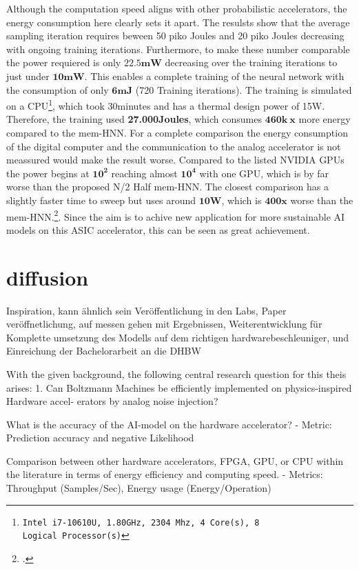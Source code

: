 Although the computation speed aligns with other probabilistic accelerators, the energy consumption here clearly sets it apart.
The resulsts show that the average sampling iteration requires beween 50 piko Joules and 20 piko Joules decreasing with ongoing training iterations.
Furthermore, to make these number comparable the power requiered is only \(\mathbf{22.5mW}\) decreasing over the training iterations to just under \(\mathbf{10mW}\).
This enables a complete training of the neural network with the consumption of only \(\mathbf{6 mJ}\) (720 Training iterations).
The training is simulated on a CPU\footnote{\texttt{Intel i7-10610U, 1.80GHz, 2304 Mhz, 4 Core(s), 8 Logical Processor(s)}}, which took 30minutes and has a thermal design power of 15W.
Therefore, the training used \textbf{27.000Joules}, which consumes \(\mathbf{460k \ x}\) more energy compared to the \ac{mem-HNN}.
For a complete comparison the energy consumption of the digital computer and the communication to the analog accelerator is not meassured 
would make the result worse. 
Compared to the listed NVIDIA \ac{GPU}s the power begins at \(\mathbf{10^2}\) reaching almost \(\mathbf{10^4}\) with one \ac{GPU},
which is by far worse than the proposed N/2 Half \ac{mem-HNN}. The closest comparison has a slightly faster time to sweep
but uses around \(\mathbf{10W}\), which is \(\mathbf{400x}\) worse than the \ac{mem-HNN}.\footcite[cf.][2]{aaditAcceleratingAdaptiveParallel2023}.
Since the aim is to achive new application for more sustainable AI models on this \ac{ASIC} accelerator, 
this can be seen as great achievement.

\section{diffusion}
Inspiration, kann ähnlich sein
Veröffentlichung in den Labs, Paper veröffnetlichung, auf messen gehen mit Ergebnissen,
Weiterentwicklung für Komplette umsetzung des Modells auf dem richtigen hardwarebeschleuniger,
und Einreichung der Bachelorarbeit an die DHBW

With the given background, the following central research question for this theis arises:
1. Can Boltzmann Machines be efficiently implemented on physics-inspired Hardware accel-
erators by analog noise injection?

 What is the accuracy of the AI-model on the hardware accelerator?
- Metric: Prediction accuracy and negative Likelihood

 Comparison between other hardware accelerators, FPGA, GPU, or CPU within the
literature in terms of energy efficiency and computing speed.
- Metrics: Throughput (Samples/Sec), Energy usage (Energy/Operation)